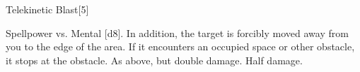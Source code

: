 \begin{spellsection}{Telekinetic Blast}[5]
    \begin{spellheader}
    \end{spellheader}
    \begin{spellcontent}
        \begin{spelltargetinginfo}
        \end{spelltargetinginfo}
        \begin{spelleffects}
            \begin{spellattack}{Spellpower vs. Mental}
                \spellsuccess {}[d8].
                In addition, the target is forcibly moved away from you to the edge of the area.
                If it encounters an occupied space or other obstacle, it stops at the obstacle.
                \spellcritical As above, but double damage.
                \spellfailure Half damage.
            \end{spellattack}
        \end{spelleffects}
    \end{spellcontent}
    \begin{spellfooter}
        \miscastexplode
    \end{spellfooter}
    \begin{spellaugments}
    \end{spellaugments}
\end{spellsection}

